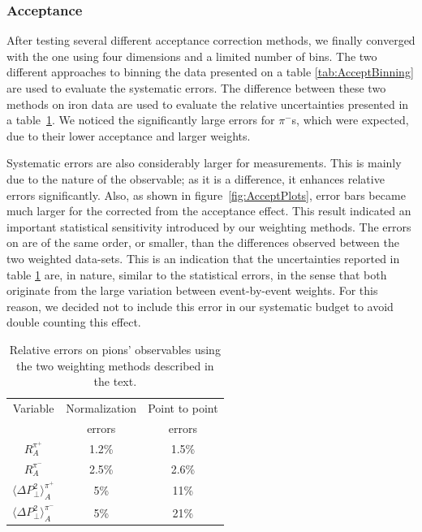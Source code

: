 \subsubsection{Acceptance}

After testing several different acceptance correction methods, we finally 
converged with the one using four dimensions and a limited number of bins.
The two different approaches to binning the data presented on a table 
\ref{tab:AcceptBinning} are used to evaluate the systematic errors. The 
difference between these two methods on iron data are used to evaluate 
the relative uncertainties presented in a table~\ref{tab:SysAcc}. We noticed 
the significantly large errors for $\pi^-$s, which were expected, due to their 
lower acceptance and larger weights. 

Systematic errors are also
considerably larger for \dpt measurements. This is mainly due to the nature of 
the \dpt observable; as it is a difference, it enhances relative errors 
significantly. Also, as shown in figure~\ref{fig:AcceptPlots}, error bars 
became much larger for the corrected \dpt from the acceptance effect. This 
result indicated an important statistical sensitivity introduced by our 
weighting methods. The errors on \dpt are of the same order, or smaller, than 
the differences observed between the two weighted data-sets. This is an 
indication that the uncertainties reported in table \ref{tab:SysAcc} are, in 
nature, similar to the statistical errors, in the sense that both originate 
from the large variation between event-by-event weights. For this reason, we 
decided not to include this error in our systematic budget to avoid double 
counting this effect.

\begin{table}[htbp]
  \centering
\renewcommand{\arraystretch}{1.3}
  \begin{tabular}{|c|c|c|}
    \hline
    Variable & Normalization & Point to point \\ 
             & errors        & errors         \\ 
    \hline
    $R^{\pi^+}_A$  & 1.2\% & 1.5\%  \\
    $R^{\pi^-}_A$  & 2.5\% & 2.6\%   \\
    $\langle \Delta P_\perp^2 \rangle^{\pi^+}_A$ & 5\% & 11\% \\
    $\langle \Delta P_\perp^2 \rangle^{\pi^-}_A$ & 5\% & 21\% \\
    \hline
  \end{tabular}
  \caption{Relative errors on pions' observables using the two weighting 
           methods described in the text.}
  \label{tab:SysAcc}
\end{table}


